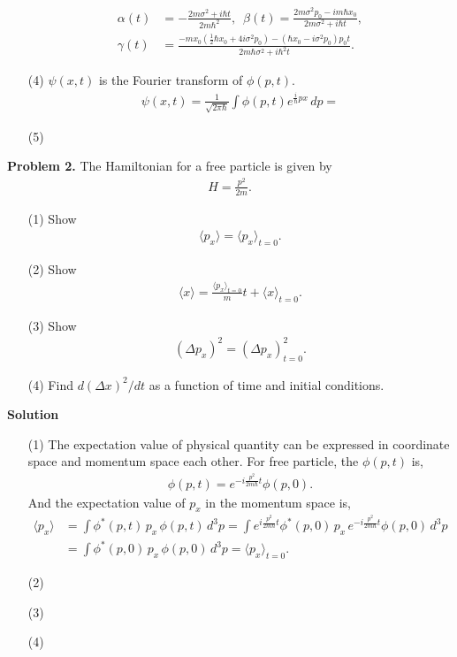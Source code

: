 \documentclass[floatfix,nofootinbib,superscriptaddress,fleqn]{revtex4}
\begin{document}
\begin{itemize}
\begin{align}
        \alpha(t) &= -\frac{2m\sigma^2+i\hbar t}{2m\hbar^2}, \,\,\,
        \beta(t) = \frac{2m\sigma^2p_0-im\hbar x_0}{2m\sigma^2+i\hbar t}, \\
        \gamma(t) &= \frac{-m x_0 \left(\frac{1}{2}\hbar x_0+4i\sigma^2p_0\right)
                    -(\hbar x_0-i\sigma^2 p_0)p_0 t}
                   {2m\hbar\sigma^2+i\hbar^2t}.
  \end{align}
  \item[(4)] $\psi(x,t)$ is the Fourier transform of $\phi(p,t)$.
  \begin{align}
    \psi(x,t) = \frac{1}{\sqrt{2\pi\hbar}}\int\phi(p,t)e^{\frac{i}{\hbar}px}\,dp = 
  \end{align}
  \item[(5)] 
  \end{itemize}
\vspace{0.5cm}

\noindent \textbf{Problem 2.} 
The Hamiltonian for a free particle is given by
\begin{align*}
H  = \frac{p^2}{2m}.
\end{align*}
\begin{itemize}
\item[(1)] Show 
  \begin{align*}
    \langle p_x \rangle = \langle p_x\rangle_{t=0}.
  \end{align*}
\item[(2)] Show 
  \begin{align*}
    \langle x \rangle = \frac{\langle p_x\rangle_{t=0}}{m} t + \langle
    x \rangle_{t=0}.
  \end{align*}
\item[(3)] Show 
  \begin{align*}
(\Delta p_x)^2 =  (\Delta p_x)_{t=0}^2  .
  \end{align*}
\item[(4)] Find $d(\Delta x)^2/dt$ as a function of time and initial 
  conditions. 
\end{itemize}
\noindent \textbf{Solution}
\begin{itemize}
  \item[(1)]The expectation value of physical quantity can be 
  expressed in coordinate space and momentum space each other.
  For free particle, the $\phi(p,t)$ is,
  \begin{align}
    \phi(p,t)=e^{-i\frac{p^2}{2m\hbar}t}\phi(p,0)  .
  \end{align}
  And the expectation value of $p_x$ in the momentum space is,
  \begin{align}
    \langle p_x \rangle &= \int \phi^*(p,t)\,p_x\,\phi(p,t)\,d^3p
    =\int e^{i\frac{p^2}{2m\hbar}t}\phi^*(p,0)\,p_x\,e^{-i\frac{p^2}{2m\hbar}t}\phi(p,0)\,d^3p  \\
    &=\int \phi^*(p,0)\,p_x\,\phi(p,0)\,d^3p = \langle p_x \rangle_{t=0}.
  \end{align}
 
  \item[(2)]
  \item[(3)]
  \item[(4)]   
\end{itemize} 
\newpage
\end{document}
